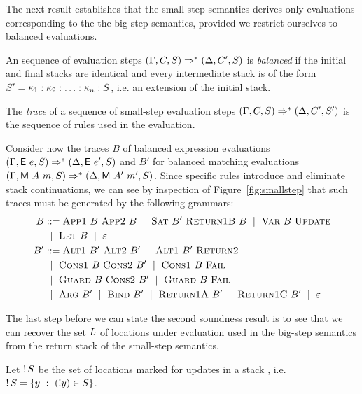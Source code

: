   The next result establishes that the small-step semantics
  derives only evaluations corresponding to the
  the big-step semantics, provided we restrict ourselves
  to balanced evaluations.

  \begin{definition}
    An sequence of evaluation steps
    $(\Gamma,C,S) \Rightarrow^{*}
    (\Delta,C',S)$ is \emph{balanced} if
    the initial and final stacks are identical and every intermediate
    stack is of the form $S' = \kappa_1:\kappa_2:\ldots:\kappa_n:S$, i.e.\@
    an extension of the initial stack.
  \end{definition}

  \begin{definition}
    The \emph{trace} of a sequence of small-step evaluation
    steps $(\Gamma,C,S) \Rightarrow^{*}
    (\Delta,C',S')$ is the sequence of rules used in the evaluation.
  \end{definition}

  Consider now the traces $B$ of balanced expression evaluations
  $(\Gamma,\textsf{E}~e,S)\Rightarrow^{*}(\Delta,\textsf{E}~e',S)$
  and $B'$ for balanced matching evaluations
  $(\Gamma,\textsf{M}~A~m,S)\Rightarrow^{*}(\Delta,\textsf{M}~A'~m',S)$. Since
  specific rules introduce and eliminate stack continuations, we can
  see by inspection of Figure~\ref{fig:smallstep} that such traces
  must be generated by the following grammars:
\begin{align}
  B &::= \textsc{App1}~ B~ \textsc{App2}~B ~\mid~
      \textsc{Sat}~B'~ \textsc{Return1B}~B
      ~\mid~ \textsc{Var}~B ~ \textsc{Update} \notag \\
  &~\mid~ \textsc{Let}~B ~\mid~ \varepsilon  \label{eq:bal-expr}\\
  B' &::= \textsc{Alt1}~B'~\textsc{Alt2}~B' ~\mid~
       \textsc{Alt1}~B'~\textsc{Return2} \notag \\
    &~\mid~ \textsc{Cons1}~ B ~\textsc{Cons2}~B' ~\mid~
      \textsc{Cons1}~ B~ \textsc{Fail} \notag \\
    & ~\mid~ \textsc{Guard}~ B ~\textsc{Cons2}~B' ~\mid~
      \textsc{Guard}~ B~ \textsc{Fail}\notag \\
    &~\mid~ \textsc{Arg}~ B' ~\mid~ \textsc{Bind}~B' 
      ~\mid~ \textsc{Return1A}~B' ~\mid~ \textsc{Return1C}~B' ~\mid~ \varepsilon
      \label{eq:bal-matching}
\end{align}

The last step before we can state the second soundness result is
to see that we can recover the set $L$ of locations under evaluation
used in the big-step semantics from the return stack of the small-step
semantics.
\begin{definition}
  Let $\mathop{!}{S}$
  be the set of locations marked
  for updates in a stack \retstack, i.e.\@
  $\mathop{!}{S} = \{ y ~:~ (!y) \in S \}$.
\end{definition}

